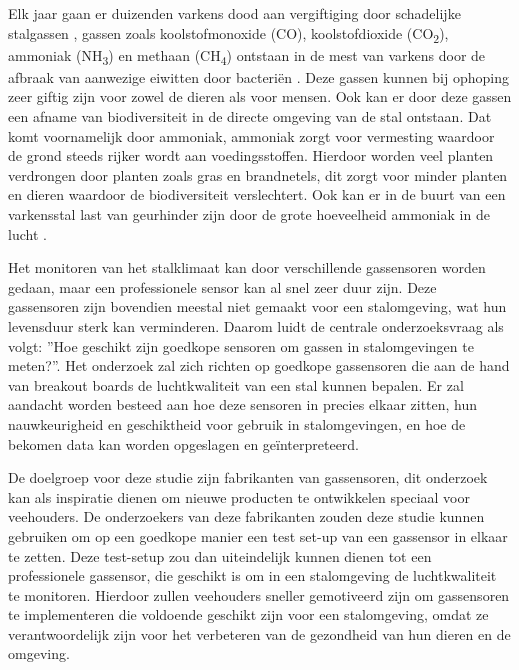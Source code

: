 Elk jaar gaan er duizenden varkens dood aan vergiftiging door schadelijke stalgassen \autocite{Sercu2023}, gassen zoals koolstofmonoxide (CO), koolstofdioxide (CO\textsubscript{2}), ammoniak (NH\textsubscript{3}) en methaan (CH\textsubscript{4}) ontstaan in de mest van varkens door de afbraak van aanwezige eiwitten door bacteriën \autocite{Wolf2013}. Deze gassen kunnen bij ophoping zeer giftig zijn voor zowel de dieren als voor mensen. Ook kan er door deze gassen een afname van biodiversiteit in de directe omgeving van de stal ontstaan. Dat komt voornamelijk door ammoniak, ammoniak zorgt voor vermesting waardoor de grond steeds rijker wordt aan voedingsstoffen. Hierdoor worden veel planten verdrongen door planten zoals gras en brandnetels, dit zorgt voor minder planten en dieren waardoor de biodiversiteit verslechtert. Ook kan er in de buurt van een varkensstal last van geurhinder zijn door de grote hoeveelheid ammoniak in de lucht \autocite{RSS2020}.

Het monitoren van het stalklimaat kan door verschillende gassensoren worden gedaan, maar een professionele sensor kan al snel zeer duur zijn. Deze gassensoren zijn bovendien meestal niet gemaakt voor een stalomgeving, wat hun levensduur sterk kan verminderen. Daarom luidt de centrale onderzoeksvraag als volgt: ''Hoe geschikt zijn goedkope sensoren om gassen in stalomgevingen te meten?''. Het onderzoek zal zich richten op goedkope gassensoren die aan de hand van breakout boards de luchtkwaliteit van een stal kunnen bepalen. Er zal aandacht worden besteed aan hoe deze sensoren in precies elkaar zitten, hun nauwkeurigheid en geschiktheid voor gebruik in stalomgevingen, en hoe de bekomen data kan worden opgeslagen en geïnterpreteerd.

De doelgroep voor deze studie zijn fabrikanten van gassensoren, dit onderzoek kan als inspiratie dienen om nieuwe producten te ontwikkelen speciaal voor veehouders. De onderzoekers van deze fabrikanten zouden deze studie kunnen gebruiken om op een goedkope manier een test set-up van een gassensor in elkaar te zetten. Deze test-setup zou dan uiteindelijk kunnen dienen tot een professionele gassensor, die geschikt is om in een stalomgeving de luchtkwaliteit te monitoren. Hierdoor zullen veehouders sneller gemotiveerd zijn om gassensoren te implementeren die voldoende geschikt zijn voor een stalomgeving, omdat ze verantwoordelijk zijn voor het verbeteren van de gezondheid van hun dieren en de omgeving.




